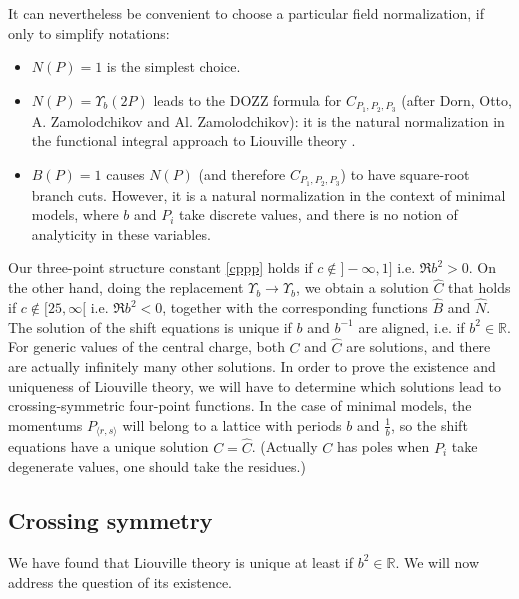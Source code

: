 \documentclass[12pt, a4paper]{article}
\theoremstyle{break}
\begin{document}
It can nevertheless be convenient to choose a particular field normalization, if only to simplify notations:
\begin{itemize}
 \item $N(P)=1$ is the simplest choice.
 \item $N(P)=\Upsilon_b(2P)$ leads to the DOZZ formula for $C_{P_1,P_2,P_3}$ (after Dorn, Otto, A.
Zamolodchikov and Al. Zamolodchikov): it is the natural normalization in the functional integral approach to Liouville theory \cite{zz95}.
\item $B(P)=1$ causes $N(P)$ (and therefore $C_{P_1,P_2,P_3}$) to have square-root branch cuts. However, it is a natural normalization in the context of minimal models, where $b$ and $P_i$ take discrete values, and there is no notion of analyticity in these variables.
\end{itemize}

Our three-point structure constant \eqref{cppp} holds if
$c\notin ]-\infty, 1]$ i.e. $\Re b^2>0$. 
On the other hand, doing the replacement $\Upsilon_b\to \hat\Upsilon_b$, we obtain a solution $\hat C$ that holds if  $c\notin [25,\infty[$ i.e. $\Re b^2<0$, together with the corresponding functions $\hat B$ and $\hat N$.
The solution of the shift equations is unique if $b$ and $b^{-1}$ are aligned, i.e. if $b^2\in\mathbb{R}$. For generic values of the central charge, both $C$ and $\hat C$ are solutions, and there are actually infinitely many other solutions. In order to prove the existence and uniqueness of Liouville theory, we will have to determine which solutions lead to crossing-symmetric four-point functions.
In the case of minimal models, the momentums $P_{\langle r,s\rangle}$ will belong to a lattice with periods $b$ and $\frac{1}{b}$, so the shift equations have a unique solution $C=\hat{C}$. (Actually $C$ has poles when $P_i$ take degenerate values, one should take the residues.)


\subsection{Crossing symmetry}\label{sec:cs}

We have found that Liouville theory is unique at least if $b^2\in\mathbb{R}$. We will now address the question of its existence. 
\end{document}
